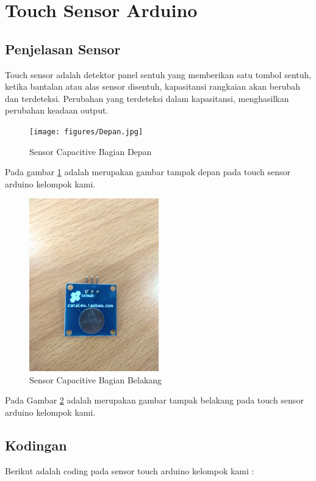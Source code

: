 \section{Touch Sensor Arduino}
	\subsection{Penjelasan Sensor}
		Touch sensor adalah detektor panel sentuh yang memberikan satu tombol sentuh, ketika bantalan atau alas sensor disentuh, kapasitansi rangkaian akan berubah dan terdeteksi. Perubahan yang terdeteksi dalam kapasitansi, menghasilkan perubahan keadaan output.
		
		\begin{figure}[ht]
			\centerline{\texttt{[image: figures/Depan.jpg]}}
			\caption{Sensor Capacitive Bagian Depan}
			\label{Depan}
			\end{figure}
		Pada gambar \ref{Depan}  adalah merupakan gambar tampak depan pada touch sensor arduino kelompok kami.
		
		\begin{figure}[ht]
			\centerline{\includegraphics[width=0.5\textwidth]{figures/Belakang.jpg}}
			\caption{Sensor Capacitive Bagian Belakang}
			\label{Belakang}
			\end{figure}
		Pada Gambar \ref{Belakang} adalah merupakan gambar tampak belakang pada touch sensor arduino kelompok kami.
		
		
	\subsection{Kodingan}
	Berikut adalah coding pada sensor touch arduino kelompok kami :
	
